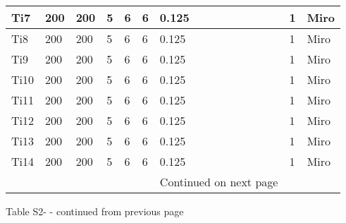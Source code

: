 \documentclass[10pt]{article}
\begin{document}
\begin{center}
\begin{tabular}{|l|l|l|l|l|l|l|l|l|}
\hline
Ti7 & 200 & 200 & 5 & 6 & 6 & 0.125 & 1 & Miro \\
\hline
Ti8 & 200 & 200 & 5 & 6 & 6 & 0.125 & 1 & Miro \\
\hline
Ti9 & 200 & 200 & 5 & 6 & 6 & 0.125 & 1 & Miro \\
\hline
Ti10 & 200 & 200 & 5 & 6 & 6 & 0.125 & 1 & Miro \\
\hline
Ti11 & 200 & 200 & 5 & 6 & 6 & 0.125 & 1 & Miro \\
\hline
Ti12 & 200 & 200 & 5 & 6 & 6 & 0.125 & 1 & Miro \\
\hline
Ti13 & 200 & 200 & 5 & 6 & 6 & 0.125 & 1 & Miro \\
\hline
Ti14 & 200 & 200 & 5 & 6 & 6 & 0.125 & 1 & Miro \\
\hline
 &  &  &  &  &  & Continued on next page &  &  \\
\hline
\end{tabular}
\end{center}

Table S2- - continued from previous page
\end{document}
